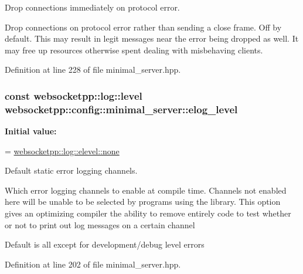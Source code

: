 Drop connections immediately on protocol error. 

Drop connections on protocol error rather than sending a close frame. Off by default. This may result in legit messages near the error being dropped as well. It may free up resources otherwise spent dealing with misbehaving clients. 

Definition at line 228 of file minimal\+\_\+server.\+hpp.

\subsubsection[{\texorpdfstring{elog\+\_\+level}{elog\_level}}]{\setlength{\rightskip}{0pt plus 5cm}const websocketpp\+::log\+::level websocketpp\+::config\+::minimal\+\_\+server\+::elog\+\_\+level\hspace{0.3cm}{\ttfamily [static]}}\hypertarget{structwebsocketpp_1_1config_1_1minimal__server_a3682c9c0dc879a125eff396be7babf4e}{}\label{structwebsocketpp_1_1config_1_1minimal__server_a3682c9c0dc879a125eff396be7babf4e}
{\bfseries Initial value\+:}
\begin{DoxyCode}
=
        \hyperlink{structwebsocketpp_1_1log_1_1elevel_ae86395aa26ec2089e07fd63b62a549fa}{websocketpp::log::elevel::none}
\end{DoxyCode}


Default static error logging channels. 

Which error logging channels to enable at compile time. Channels not enabled here will be unable to be selected by programs using the library. This option gives an optimizing compiler the ability to remove entirely code to test whether or not to print out log messages on a certain channel

Default is all except for development/debug level errors 

Definition at line 202 of file minimal\+\_\+server.\+hpp.

